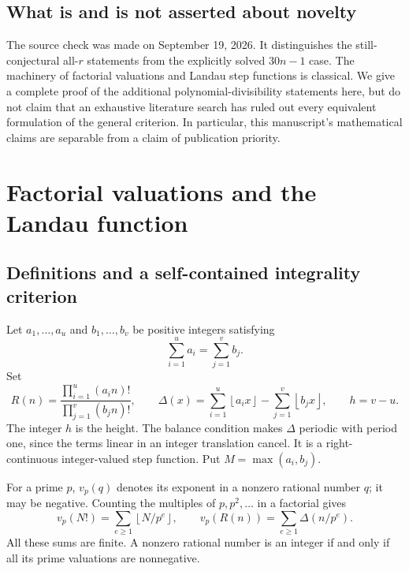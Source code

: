 \documentclass[11pt]{article}
\theoremstyle{definition}
\theoremstyle{remark}
\newcommand{\vp}{v_p}
\newcommand{\floor}[1]{\left\lfloor #1\right\rfloor}
\begin{document}
\subsection{What is and is not asserted about novelty}
The source check was made on September 19, 2026. It distinguishes the
still-conjectural all-$r$ statements from the explicitly solved
$30n-1$ case. The machinery of factorial valuations and Landau step
functions is classical. We give a complete proof of the additional
polynomial-divisibility statements here, but do not claim that an
exhaustive literature search has ruled out every equivalent formulation
of the general criterion. In particular, this manuscript's mathematical
claims are separable from a claim of publication priority.

\section{Factorial valuations and the Landau function}
\subsection{Definitions and a self-contained integrality criterion}
Let $a_1,\ldots,a_u$ and $b_1,\ldots,b_v$ be positive integers satisfying
\begin{equation}\label{eq:balance}
 \sum_{i=1}^u a_i=\sum_{j=1}^v b_j.
\end{equation}
Set
\begin{equation}\label{eq:RDelta}
 R(n)=\frac{\prod_{i=1}^u(a_i n)!}{\prod_{j=1}^v(b_j n)!},\qquad
 \Delta(x)=\sum_{i=1}^u\floor{a_i x}-\sum_{j=1}^v\floor{b_j x},
 \qquad h=v-u.
\end{equation}
The integer $h$ is the height. The balance condition makes $\Delta$
periodic with period one, since the terms linear in an integer
translation cancel. It is a right-continuous integer-valued step
function. Put $M=\max(a_i,b_j)$.

For a prime $p$, $\vp(q)$ denotes its exponent in a nonzero rational
number $q$; it may be negative. Counting the multiples of $p,p^2,\ldots$
in a factorial gives
\begin{equation}\label{eq:legendre}
 \vp(N!)=\sum_{e\geq1}\floor{N/p^e},
 \qquad
 \vp(R(n))=\sum_{e\geq1}\Delta(n/p^e).
\end{equation}
All these sums are finite. A nonzero rational number is an integer if
and only if all its prime valuations are nonnegative.
\end{document}
